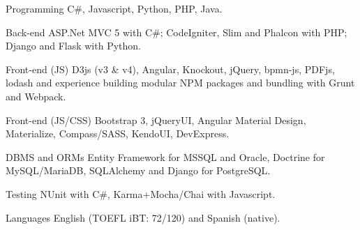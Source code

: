 


\begin{cvskills}


\cvskill
{Programming} %
{C\#, Javascript, Python, PHP, Java.} %


\cvskill
{Back-end} %
{ASP.Net MVC 5 with C\#; CodeIgniter, Slim and Phalcon with PHP; Django and Flask with Python.} %


\cvskill
{Front-end (JS)} %
{D3js (v3 \& v4), Angular, Knockout, jQuery, bpmn-js, PDFjs, lodash and experience building
	 modular NPM packages and bundling with Grunt and Webpack.} %
	

\cvskill
{Front-end (JS/CSS)} %
{Bootstrap 3, jQueryUI, Angular Material Design, Materialize, Compass/SASS, KendoUI, DevExpress.} %


\cvskill
{DBMS and ORMs} %
{Entity Framework for MSSQL and Oracle, Doctrine for MySQL/MariaDB, SQLAlchemy and Django for PostgreSQL.} %



\cvskill
{Testing} %
{NUnit with C\#, Karma+Mocha/Chai with Javascript.} %



\cvskill
{Languages} %
{English (TOEFL iBT: 72/120) and Spanish (native).} %


\end{cvskills}
